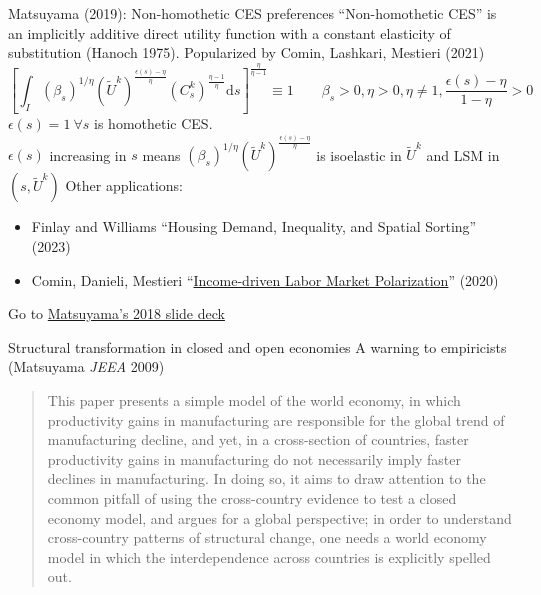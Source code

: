 \documentclass[11pt,notes=hide,aspectratio=169]{beamer}
\begin{document}
\begin{frame}{Matsuyama (2019): Non-homothetic CES preferences}
``Non-homothetic CES'' is an implicitly additive direct utility function with a constant elasticity of substitution (Hanoch 1975). Popularized by Comin, Lashkari, Mestieri (2021)
\begin{equation*}
\left[\int_{I}\left(\beta_{s}\right)^{1/\eta}\left(\tilde{U}^{k}\right)^{\frac{\epsilon(s) - \eta}{\eta}}\left(C^k_s\right)^{\frac{\eta-1}{\eta}}\textrm{d} s\right]^{\frac{\eta}{\eta-1}}
\equiv 1
\qquad
\beta_{s} > 0, \eta > 0, \eta \neq 1, \frac{\epsilon(s)-\eta}{1-\eta} >0
\end{equation*}
$\epsilon(s) = 1 \ \forall s$ is homothetic CES.\\
$\epsilon(s)$ increasing in $s$ means
$\left(\beta_{s}\right)^{1/\eta}\left(\tilde{U}^{k}\right)^{\frac{\epsilon(s) - \eta}{\eta}}$
is isoelastic in $\tilde{U}^{k}$ and LSM in $(s,\tilde{U}^{k})$
\smallskip
Other applications:
\begin{itemize}
\item {\small Finlay and Williams ``Housing Demand, Inequality, and Spatial Sorting'' (2023)}
\item {\small Comin, Danieli, Mestieri ``\href{https://www.nber.org/papers/w27455}{Income-driven Labor Market Polarization}'' (2020)}
\end{itemize}
Go to \href{https://tinyurl.com/MatsuyamaEngeldeck}{Matsuyama's 2018 slide deck}
\end{frame}
\begin{frame}{Structural transformation in closed and open economies}
A warning to empiricists (Matsuyama \textit{JEEA} 2009)
\begin{quote}
This paper presents a simple model of the world economy, in which productivity gains in manufacturing are responsible for the global trend of manufacturing decline, and yet, in a cross-section of countries, faster productivity gains in manufacturing do not necessarily imply faster declines in manufacturing.
In doing so, it aims to draw attention to the common pitfall of using the cross-country evidence to test a closed economy model, and argues for a global perspective; in order to understand cross-country patterns of structural change, one needs a world economy model in which the interdependence across countries is explicitly spelled out.
\end{quote}
\end{frame}
\end{document}
